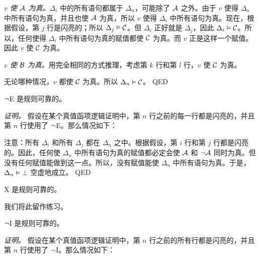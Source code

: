 \begin{numberlist}
	   \item\emph{$v$ 使 $\mathcal{A}$ 为真。}$\Delta_i$ 中的所有语句都属于 $\Delta_{n}$，可能除了 $\mathcal{A}$ 之外。由于 $v$ 使得 $\Delta_{n}$ 中所有语句为真，并且也使 $\mathcal{A}$ 为真，所以 $v$ 使得 $\Delta_i$ 中所有语句为真。现在，根据假设，第 $j$ 行是闪亮的；所以 $\Delta_{j} \vDash \mathcal{C}$。但 $\Delta_i$ 正好就是 $\Delta_{j}$，因此 $\Delta_i \vDash \mathcal{C}$。所以，任何使得 $\Delta_i$ 中所有语句为真的赋值都使 $\mathcal{C}$ 为真。而 $v$ 正是这样一个赋值。因此 $v$ 使 $\mathcal{C}$ 为真。
	   \item\emph{$v$ 使 $\mathcal{B}$ 为真。}用完全相同的方式推理，考虑第 $k$ 行和第 $l$ 行，$v$ 使 $\mathcal{C}$ 为真。
\end{numberlist}

无论哪种情况，$v$ 都使 $\mathcal{C}$ 为真。所以 $\Delta_n \vDash \mathcal{C}$。
\textsc{QED}

\begin{factoidboxe}
	$\neg$E 是规则可靠的。
\end{factoidboxe}

\emph{证明。}
	假设在某个真值函项逻辑证明中，第 $n$ 行之前的每一行都是闪亮的，并且第 $n$ 行使用了 $\neg$E。那么情况如下：

\begin{fitchproof}
\end{fitchproof}

\noindent
注意：所有 $\Delta_i$ 和所有 $\Delta_j$ 都在 $\Delta_{n}$ 之中。根据假设，第 $i$ 行和第 $j$ 行都是闪亮的。因此，任何使 $\Delta_{n}$ 中所有语句为真的赋值都必定会使 $\mathcal{A}$ 和 $\neg\mathcal{A}$ 同时为真。但没有任何赋值能做到这一点。所以，没有赋值能使 $\Delta_{n}$ 中所有语句为真。于是，$\Delta_{n} \vDash \bot$ 空虚地成立。
\textsc{QED}

\begin{factoidboxe}
	X 是规则可靠的。
\end{factoidboxe}

我们将此留作练习。

\begin{factoidboxe}
	$\neg$I 是规则可靠的。
\end{factoidboxe}

\emph{证明。}
	假设在某个真值函项逻辑证明中，第 $n$ 行之前的所有行都是闪亮的，并且第 $n$ 行使用了 $\neg$I。那么情况如下：

\begin{fitchproof}
   \open
	   \AS
   \close
\end{fitchproof}

